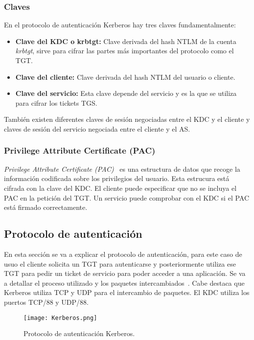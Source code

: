 \subsubsection{Claves}

En el protocolo de autenticación Kerberos hay tres claves fundamentalmente: 
\begin{itemize}
\item \textbf{Clave del KDC o krbtgt:} Clave derivada del hash NTLM de la cuenta {\it krbtgt}, sirve para cifrar las partes más importantes del protocolo como el TGT.
\item \textbf{Clave del cliente: } Clave derivada del hash NTLM del usuario o cliente. 
\item \textbf{Clave del servicio: } Esta clave depende del servicio y es la que se utiliza para cifrar los tickets TGS. 
\end{itemize}

También existen diferentes claves de sesión negociadas entre el KDC y el cliente y claves de sesión del servicio negociada entre el cliente y el AS. 

\subsubsection{Privilege Attribute Certificate (PAC)}

{\it Privilege Attribute Certificate (PAC)}~\cite{Capitulo3:PAC} es una estructura de datos que recoge la información codificada sobre los privilegios del usuario. Esta estrucura está cifrada con la clave del KDC. El cliente puede especificar que no se incluya el PAC en la petición del TGT. Un servicio puede comprobar con el KDC si el PAC está firmado correctamente. 

\subsection{Protocolo de autenticación}

En esta sección se va a explicar el protocolo de autenticación, para este caso de usuo el cliente solicita un TGT para autenticarse y posteriormente utiliza ese TGT para pedir un ticket de servicio para poder acceder a una aplicación. Se va a detallar el proceso utilizado y los paquetes intercambiados~\cite{Capitulo3:Kerberos5}. Cabe destaca que Kerberos utiliza  TCP y UDP para el intercambio de paquetes. El KDC utiliza los puertos TCP/88 y UDP/88.   

\begin{figure}[t!] %
\begin{center}
\texttt{[image: Kerberos.png]}
\end{center}
\caption{Protocolo de autenticación Kerberos.}
\label{Kerberos}
\end{figure}

